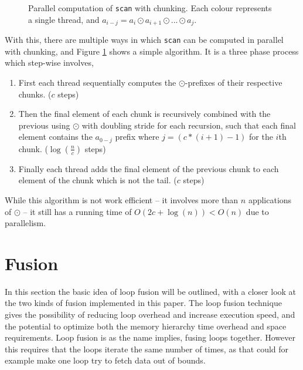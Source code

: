 \documentclass[11pt]{article}
\begin{document}
\begin{figure}[h!]
  
  \caption{Parallel computation of \texttt{scan} with chunking. Each colour represents a single thread, and $a_{i-j} = a_i \odot a_{i+1} \odot ... \odot a_j$.}
  \label{fig:scancomp1}
\end{figure}
With this, there are multiple ways in which \texttt{scan} can be computed in parallel with chunking, and Figure \ref{fig:scancomp1} shows a simple algorithm.
 It is a three phase process which step-wise involves,
 \begin{enumerate}
 \item First each thread sequentially computes the $\odot$-prefixes of their respective chunks. ($c$ steps)
 \item Then the final element of each chunk is recursively combined with the previous using $\odot$ with
 doubling stride for each recursion, such that each final element contains the $a_{0-j}$ prefix where $j = (c * (i+1) - 1)$ for the
 $i$th chunk. ($\log(\frac{n}{c})$ steps)
 \item Finally each thread adds the final element of the previous chunk to each element of the chunk
 which is not the tail. ($c$ steps)
 \end{enumerate}
While this algorithm is not work efficient -- it involves more than $n$ applications of $\odot$ -- it still has a running time of $O(2c + \log(n)) < O(n)$ due to parallelism.

\section{Fusion}
In this section the basic idea of loop fusion will be outlined, with a closer look at the two kinds of fusion implemented in this paper.
The loop fusion technique gives the possibility of reducing loop overhead and increase execution speed, and the potential to optimize both the memory hierarchy time overhead and space requirements. Loop fusion is as the name implies, fusing loops together. However this requires that the loops iterate the same number of times, as that could for example make one loop try to fetch data out of bounds. \\
\end{document}
